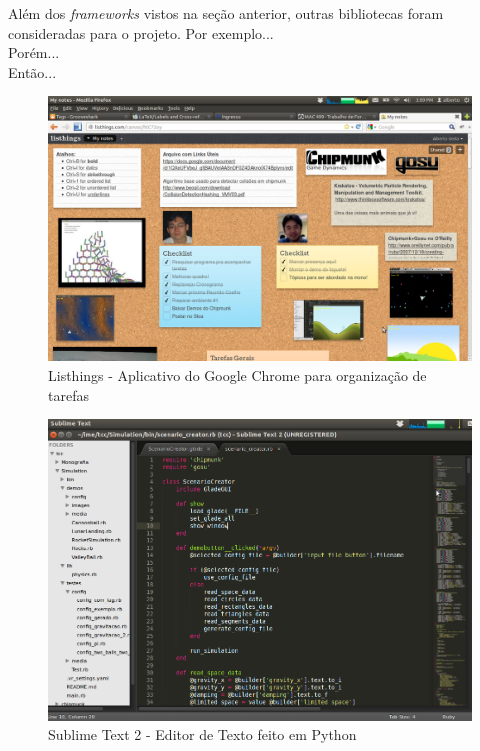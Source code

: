 Além dos \textit{frameworks} vistos na seção anterior, outras bibliotecas foram consideradas para o projeto. Por exemplo...\\
Porém...\\
Então...

\begin{figure}[H]
	\centering
	\caption{Listhings - Aplicativo do Google Chrome para organização de tarefas }
	\includegraphics[scale=0.3]{images/listhings.png}
	\hspace{0.5cm}
\end{figure}

\begin{figure}[H]
	\centering
	\caption{Sublime Text 2 - Editor de Texto feito em Python}
	\includegraphics[scale=0.3]{images/sublime-text-2.png}
	\hspace{0.5cm}
\end{figure}


